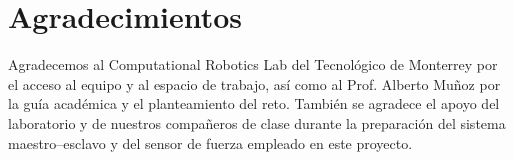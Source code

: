 \documentclass[journal,10pt,twoside]{IEEEtran}
\begin{document}
\section*{Agradecimientos}

Agradecemos al Computational Robotics Lab del Tecnológico de Monterrey por el acceso al equipo y al espacio de trabajo,
así como al Prof. Alberto Muñoz por la guía académica y el planteamiento del reto. 
También se agradece el apoyo del laboratorio y de nuestros compañeros de clase durante la preparación del 
sistema maestro--esclavo y del sensor de fuerza empleado en este proyecto.

\end{document}
